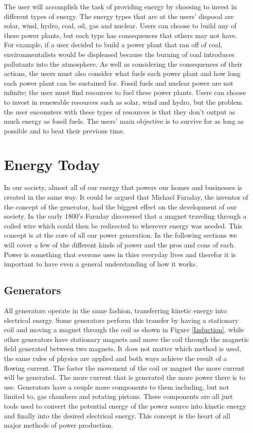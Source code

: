 \documentclass[msc,oneside]{ubcthesis}%
\begin{document}
The user will accomplish the task of providing energy by choosing to invest in different types of energy. 
The energy types that are at the users' disposal are solar, wind, hydro, coal, oil, gas and nuclear. Users 
can choose to build any of these power plants, but each type has consequences that others may not have. For 
example, if a user decided to build a power plant that ran off of coal, environmentalists would be 
displeased because the burning of coal introduces pollutants into the atmosphere. As well as considering 
the consequences of their actions, the users must also consider what fuels each power plant and how long 
each power plant can be sustained for. Fossil fuels and nuclear power are not infinite; the user must find 
resources to fuel these power plants. Users can choose to invest in renewable resources such as solar, wind 
and hydro, but the problem the user encounters with these types of resources is that they don't output as 
much energy as fossil fuels. The users' main objective is to survive for as long as possible and to beat 
their previous time. 

\chapter{Energy Today}
  In our society, almost all of our energy that powers our homes and businesses is created in the same way. 
It could be argued that Michael Faraday, the inventor of the concept of the generator, had the biggest 
effect on the development of our society. In the early 1800's Faraday discovered that a magnet traveling 
through a coiled wire which could then be redirected 
to wherever energy was needed. This concept is at the core of all our power generation. In the following sections we will cover a few of the different kinds of power and the pros and cons of each. Power is something that everone uses in thier everyday lives and therefor it is important to have even a general understanding of how it works. 

\section{Generators}
  
  All generators operate in the same fashion, transferring kinetic energy into electrical energy. Some generators perform this transfer by having a stationary coil and moving a magnet through the coil as shown in Figure \ref{Induction}, while other generators have stationary magnets and move the coil through the magnetic field generated between two magnets. It does not matter which method is used, the same rules of physics are applied and both ways achieve the result of a flowing current. The faster the movement of the coil or magnet the more current will be generated. 
  The more current that is generated the more power there is to use. Generators have a couple more components to them including, but not limited to, gas chambers and rotating pistons. These components are all just tools used to convert the potential energy of the power source into kinetic energy and finally into the desired electrical energy. This concept is the heart of all major methods of power production.
\end{document}
